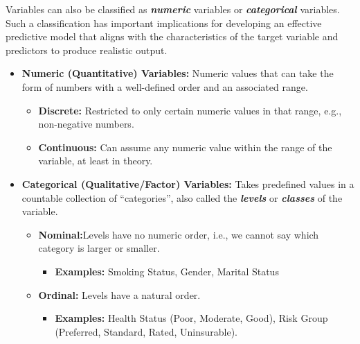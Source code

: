 \documentclass[
  12pt,
]{krantz}
\providecommand{\tightlist}{%
  \setlength{\itemsep}{0pt}\setlength{\parskip}{0pt}}
\begin{document}
\begin{itemize}
  Variables can also be classified as \textbf{\emph{numeric}} variables or
  \textbf{\emph{categorical}} variables. Such a classification has important
  implications for developing an effective predictive model that aligns with
  the characteristics of the target variable and predictors to produce
  realistic output.

  \begin{itemize}
  \tightlist
  \item
    \textbf{Numeric (Quantitative) Variables:} Numeric values that can take the
    form of numbers with a well-defined order and an associated range.

    \begin{itemize}
    \tightlist
    \item
      \textbf{Discrete:} Restricted to only certain numeric values in that
      range, e.g., non-negative numbers.
    \item
      \textbf{Continuous:} Can assume any numeric value within the range of the
      variable, at least in theory.
    \end{itemize}
  \item
    \textbf{Categorical (Qualitative/Factor) Variables:} Takes predefined values
    in a countable collection of ``categories'', also called the \textbf{\emph{levels}}
    or \textbf{\emph{classes}} of the variable.

    \begin{itemize}
    \tightlist
    \item
      \textbf{Nominal:}Levels have no numeric order, i.e., we cannot say which
      category is larger or smaller.

      \begin{itemize}
      \tightlist
      \item
        \textbf{Examples:} Smoking Status, Gender, Marital Status
      \end{itemize}
    \item
      \textbf{Ordinal:} Levels have a natural order.

      \begin{itemize}
      \tightlist
      \item
        \textbf{Examples:} Health Status (Poor, Moderate, Good), Risk Group
        (Preferred, Standard, Rated, Uninsurable).
      \end{itemize}
    \end{itemize}
  \end{itemize}
\end{itemize}
\end{document}

